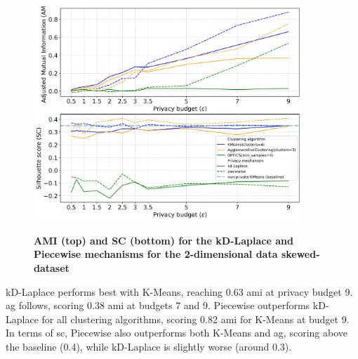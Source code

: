 \newpage
\begin{figure}[H]
  \centering
  \caption{\textbf{AMI (top) and SC (bottom) for the kD-Laplace and Piecewise mechanisms for the 2-dimensional data skewed-dataset}}
  \includegraphics[width=0.9\textwidth]{Results/kd-laplace/kd-Laplace/skewed-dataset/ami-and-sc_2_dimensions.png}
  \label{fig:validation-skewed-dataset_comparison_2d-laplace}
\end{figure}
kD-Laplace performs best with K-Means, reaching 0.63 \gls{ami} at privacy budget 9.
\gls{ag} follows, scoring 0.38 \gls{ami} at budgets 7 and 9.
Piecewise outperforms kD-Laplace for all clustering algorithms, scoring 0.82 \gls{ami} for K-Means at budget 9.
In terms of \gls{sc}, Piecewise also outperforms both K-Means and \gls{ag}, scoring above the baseline (0.4), while kD-Laplace is slightly worse (around 0.3).
\newpage
